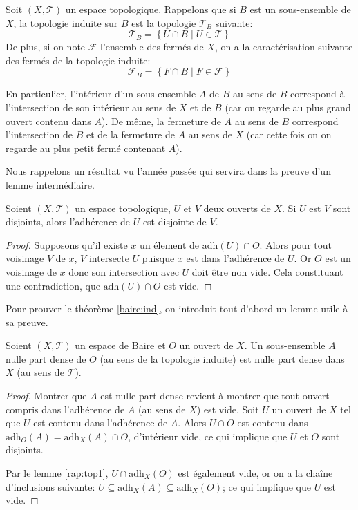 \begin{rem}[Rappels]
  Soit $(X, \mathcal{T})$ un espace topologique.
  Rappelons que si $B$ est un sous-ensemble de $X$, la topologie
  induite sur $B$ est la topologie $\mathcal{T}_B$ suivante:
  $$\mathcal{T}_B=\left\{U\cap B\mid U\in\mathcal{T}\right\}$$
  De plus, si on note $\mathcal{F}$ l'ensemble des fermés de $X$,
  on a la caractérisation suivante des fermés de la topologie
  induite:
  $$\mathcal{F}_B=\left\{F\cap B\mid F\in\mathcal{F}\right\}$$

  En particulier, l'intérieur d'un sous-ensemble $A$ de $B$
  au sens de $B$ correspond à l'intersection de son intérieur
  au sens de $X$ et de $B$ (car on regarde au plus grand ouvert
  contenu dans $A$).
  De même, la fermeture de $A$ au sens de $B$ correspond
  l'intersection de $B$ et de la fermeture de $A$ au sens
  de $X$ (car cette fois on on regarde au plus petit fermé
  contenant $A$).
\end{rem}

Nous rappelons un résultat vu l'année passée qui servira dans la preuve
d'un lemme intermédiaire.
\begin{lem}\label{rap:top1}
  Soient $(X, \mathcal{T})$ un espace topologique, $U$ et $V$ deux ouverts
  de $X$. Si $U$ est $V$ sont disjoints, alors l'adhérence de $U$ est disjointe
  de $V$.
\end{lem}
\begin{proof}
  Supposons qu'il existe $x$ un élement de $\mathrm{adh}(U)\cap O$.
  Alors pour tout voisinage $V$ de $x$, $V$ intersecte $U$ puisque
  $x$ est dans l'adhérence de $U$. Or $O$ est un voisinage de $x$
  donc son intersection avec $U$ doit être non vide. Cela constituant
  une contradiction, que $\mathrm{adh}(U)\cap O$ est vide.
\end{proof}


Pour prouver le théorème \ref{baire:ind},
on introduit tout d'abord un lemme utile
à sa preuve.
\begin{lem}\label{baire:ind:help}
  Soient $(X, \mathcal{T})$ un espace de Baire et $O$ un ouvert de $X$.
  Un sous-ensemble $A$ nulle part dense de $O$ (au sens de la topologie
  induite) est nulle part dense dans $X$ (au sens de $\mathcal{T}$).
\end{lem}

\begin{proof}
  Montrer que $A$ est nulle part dense revient à montrer que
  tout ouvert compris dans l'adhérence de $A$ (au sens de $X$) est vide. Soit $U$
  un ouvert de $X$ tel que $U$ est contenu dans l'adhérence
  de $A$. Alors $U\cap O$ est contenu dans $\mathrm{adh}_O(A) =
  \mathrm{adh}_X(A)\cap O$, d'intérieur vide, ce qui implique que $U$ et $O$
  sont disjoints.

  Par le lemme \ref{rap:top1}, $U\cap \mathrm{adh}_X(O)$
  est également vide, or on a la chaîne d'inclusions suivante:
  $U\subseteq \mathrm{adh}_X(A)\subseteq \mathrm{adh}_X(O)$;
  ce qui implique que $U$ est vide.
\end{proof}

